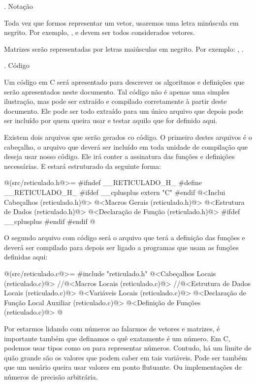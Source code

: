 {\tenbold{}. Notação}

Toda vez que formos representar um vetor, usaremos uma letra minúscula
em negrito. Por exemplo, ,  e  devem ser
todos considerados vetores.

Matrizes serão representadas por letras maiúsculas em negrito. Por
exemplo: , .

{\tenbold{}. Código}

Um código em C será apresentado para descrever os algoritmos e
definições que serão apresentados neste documento. Tal código não é
apenas uma simples ilustração, mas pode ser extraído e compilado
corretamente à partir deste documento. Ele pode ser todo extraído para
um único arquivo que depois pode ser incluído por quem queira usar e
testar aquilo que for definido aqui.

Existem dois arquivos que serão gerados co código. O primeiro destes
arquivos é o cabeçalho, o arquivo  que deverá
ser incluído em toda unidade de compilação que deseja usar nosso
código. Ele irá conter a assinatura das funções e definições
necessárias. E estará estruturado da seguinte forma:

\iniciocodigo
@(src/reticulado.h@>=
#ifndef __RETICULADO_H_
#define __RETICULADO_H_
#ifdef __cplusplus
extern "C" {
#endif
@<Inclui Cabeçalhos (reticulado.h)@>
@<Macros Gerais (reticulado.h)@>
@<Estrutura de Dados (reticulado.h)@>
@<Declaração de Função (reticulado.h)@>
#ifdef __cplusplus
}
#endif
#endif
@
\fimcodigo

O segundo arquivo com código será o arquivo 
que terá a definição das funções e deverá ser compilado para depois
ser ligado a programas que usam as funções definidas aqui:

\iniciocodigo
@(src/reticulado.c@>=
#include "reticulado.h"
@<Cabeçalhos Locais (reticulado.c)@>
//@<Macros Locais (reticulado.c)@>
//@<Estrutura de Dados Locais (reticulado.c)@>
@<Variáveis Locais (reticulado.c)@>
@<Declaração de Função Local Auxiliar (reticulado.c)@>
@<Definição de Funções (reticulado.c)@>
@
\fimcodigo


Por estarmos lidando com números ao falarmos de vetores e matrizes, é
importante também que definamos o quê exatamente é um número. Em C,
podemos usar tipos como  ou  para
representar números. Contudo, há um limite de quão grande são os
valores que podem caber em tais variáveis. Pode ser também que um
usuário queira usar valores em ponto flutuante. Ou implementações de
números de precisão arbitrária.

